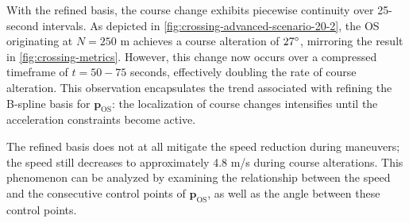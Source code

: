 With the refined basis, the course change exhibits piecewise continuity over 25-second intervals. As depicted in \cref{fig:crossing-advanced-scenario-20-2}, the OS originating at $N=250$ m achieves a course alteration of $27\degree$, mirroring the result in \cref{fig:crossing-metrics}. However, this change now occurs over a compressed timeframe of $t=50-75$ seconds, effectively doubling the rate of course alteration. This observation encapsulates the trend associated with refining the B-spline basis for $\mathbf p_\text{OS}$: the localization of course changes intensifies until the acceleration constraints become active.

The refined basis does not at all mitigate the speed reduction during maneuvers; the speed still decreases to approximately 4.8 m/s during course alterations. This phenomenon can be analyzed by examining the relationship between the speed and the consecutive control points of $\mathbf p_\text{OS}$, as well as the angle between these control points.

